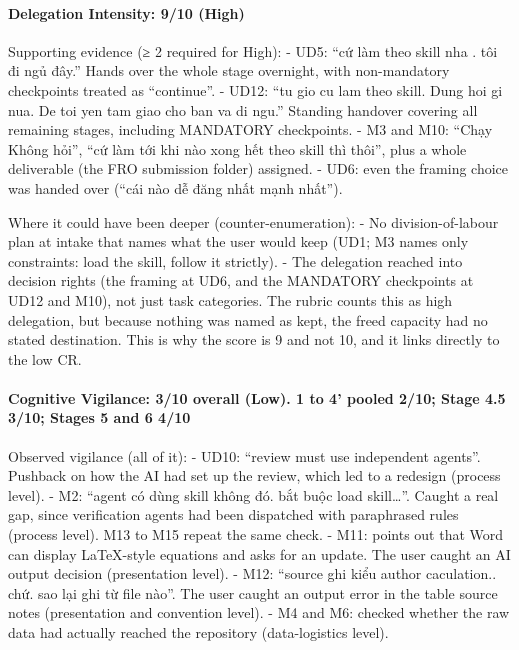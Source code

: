 \documentclass[12pt,a4paper]{article}
\begin{document}
\hypertarget{delegation-intensity-910-high}{%
\paragraph{Delegation Intensity: 9/10
(High)}\label{delegation-intensity-910-high}}

Supporting evidence (≥ 2 required for High): - UD5: ``cứ làm theo skill
nha . tôi đi ngủ đây.'' Hands over the whole stage overnight, with
non-mandatory checkpoints treated as ``continue''. - UD12: ``tu gio cu
lam theo skill. Dung hoi gi nua. De toi yen tam giao cho ban va di
ngu.'' Standing handover covering all remaining stages, including
MANDATORY checkpoints. - M3 and M10: ``Chạy Không hỏi'', ``cứ làm tới
khi nào xong hết theo skill thì thôi'', plus a whole deliverable (the
FRO submission folder) assigned. - UD6: even the framing choice was
handed over (``cái nào dễ đăng nhất mạnh nhất'').

Where it could have been deeper (counter-enumeration): - No
division-of-labour plan at intake that names what the user would keep
(UD1; M3 names only constraints: load the skill, follow it strictly). -
The delegation reached into decision rights (the framing at UD6, and the
MANDATORY checkpoints at UD12 and M10), not just task categories. The
rubric counts this as high delegation, but because nothing was named as
kept, the freed capacity had no stated destination. This is why the
score is 9 and not 10, and it links directly to the low CR.

\hypertarget{cognitive-vigilance-310-overall-low.-1-to-4-pooled-210-stage-4.5-310-stages-5-and-6-410}{%
\paragraph{Cognitive Vigilance: 3/10 overall (Low). 1 to 4' pooled 2/10;
Stage 4.5 3/10; Stages 5 and 6
4/10}\label{cognitive-vigilance-310-overall-low.-1-to-4-pooled-210-stage-4.5-310-stages-5-and-6-410}}

Observed vigilance (all of it): - UD10: ``review must use independent
agents''. Pushback on how the AI had set up the review, which led to a
redesign (process level). - M2: ``agent có dùng skill không đó. bắt buộc
load skill\ldots{}''. Caught a real gap, since verification agents had
been dispatched with paraphrased rules (process level). M13 to M15
repeat the same check. - M11: points out that Word can display
LaTeX-style equations and asks for an update. The user caught an AI
output decision (presentation level). - M12: ``source ghi kiểu author
caculation.. chứ. sao lại ghi từ file nào''. The user caught an output
error in the table source notes (presentation and convention level). -
M4 and M6: checked whether the raw data had actually reached the
repository (data-logistics level).
\end{document}
